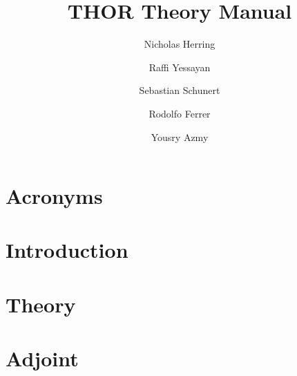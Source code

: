 \documentclass[twoside]{report}
\title{THOR Theory Manual}
\author[1]{Nicholas Herring}
\author[2]{Raffi Yessayan}
\author[3]{Sebastian Schunert}
\author[4]{Rodolfo Ferrer}
\author[1]{Yousry Azmy}
\affil[1]{North Carolina State University}
\affil[2]{Los Alamos National Laboratory}
\affil[3]{Idaho National Laboratory}
\affil[4]{Studsvik Scandpower}
\begin{document}



%

\chapter*{Acronyms}


\tableofcontents


\clearpage
{}
\pagestyle{fancy}

\chapter{Introduction}



\chapter{Theory}



\chapter{Adjoint}






\end{document}
